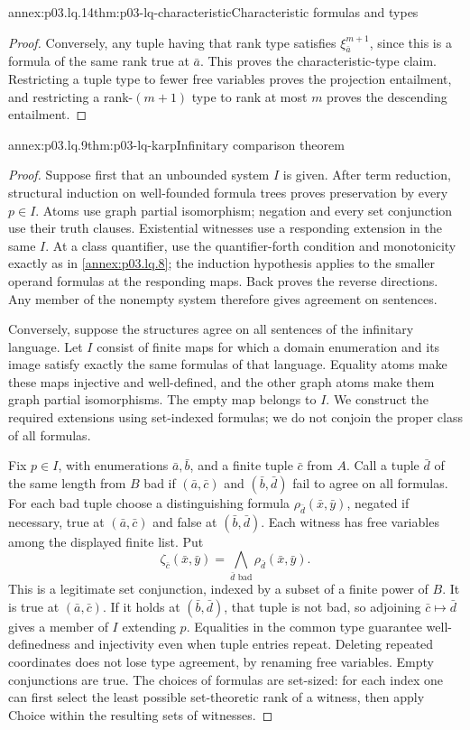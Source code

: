 \begin{annexitem}{annex:p03.lq.14}{thm:p03-lq-characteristic}{Characteristic formulas and types}
\begin{proof}
Conversely, any tuple having that rank type satisfies
\(\xi^{m+1}_{\bar a}\), since this is a formula of the same
rank true at \(\bar a\). This proves the characteristic-type
claim. Restricting a tuple type to fewer free variables proves
the projection entailment, and restricting a rank-\((m+1)\)
type to rank at most \(m\) proves the descending entailment.
\end{proof}
\end{annexitem}

\begin{annexitem}{annex:p03.lq.9}{thm:p03-lq-karp}{Infinitary comparison theorem}
\begin{proof}
Suppose first that an unbounded system \(I\) is given. After term
reduction, structural induction on well-founded formula trees proves
preservation by every \(p\in I\). Atoms use graph partial isomorphism;
negation and every set conjunction use their truth clauses.
Existential witnesses use a responding extension in the same \(I\).
At a class quantifier, use the quantifier-forth condition and
monotonicity exactly as in
\cref{annex:p03.lq.8}; the induction hypothesis
applies to the smaller operand formulas at the responding maps.
Back proves the reverse directions. Any member of the nonempty
system therefore gives agreement on sentences.

Conversely, suppose the structures agree on all sentences of the
infinitary language. Let \(I\) consist of finite maps for which a
domain enumeration and its image satisfy exactly the same formulas
of that language. Equality atoms make these maps injective and
well-defined, and the other graph atoms make them graph partial
isomorphisms. The empty map belongs to \(I\).
We construct the required extensions using set-indexed formulas;
we do not conjoin the proper class of all formulas.

Fix \(p\in I\), with enumerations \(\bar a,\bar b\), and a
finite tuple \(\bar c\) from \(A\). Call a tuple \(\bar d\)
of the same length from \(B\) bad if
\((\bar a,\bar c)\) and \((\bar b,\bar d)\) fail to agree
on all formulas. For each bad tuple choose a distinguishing formula
\(\rho_{\bar d}(\bar x,\bar y)\), negated if necessary, true
at \((\bar a,\bar c)\) and false at \((\bar b,\bar d)\).
Each witness has free variables among the displayed finite
list. Put
\[
 \zeta_{\bar c}(\bar x,\bar y)
       =\bigwedge_{\bar d\text{ bad}}\rho_{\bar d}(\bar x,\bar y).
\]
This is a legitimate set conjunction, indexed by a subset of a
finite power of \(B\). It is true at \((\bar a,\bar c)\).
If it holds at \((\bar b,\bar d)\), that tuple is not bad, so
adjoining \(\bar c\mapsto\bar d\) gives a member of \(I\)
extending \(p\). Equalities in the common type guarantee
well-definedness and injectivity even when tuple entries repeat.
Deleting repeated coordinates does not lose type agreement, by
renaming free variables. Empty conjunctions are true.
The choices of formulas are set-sized: for each index one can
first select the least possible set-theoretic rank of a witness,
then apply Choice within the resulting sets of witnesses.


\end{proof}
\end{annexitem}
